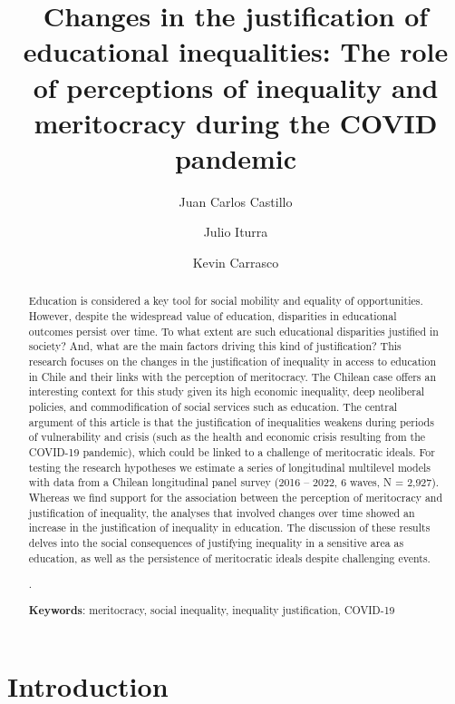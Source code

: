 \documentclass[
  12pt,
  a4paper,
]{article}
\title{Changes in the justification of educational inequalities: The role of perceptions of inequality and meritocracy during the COVID pandemic}
\author[1, 3]{Juan Carlos Castillo}
\affil[]{Department of Sociology, Universidad de Chile \thanks{\href{mailto:juancastillov@uchile.cl}{\nolinkurl{juancastillov@uchile.cl}}}}
\author[2]{Julio Iturra}
\affil[]{Bremen International Graduate School of Social Sciences, Universität Bremen}
\author[3]{Kevin Carrasco}
\affil[]{Center for Social Conflict and Cohesion Studies}
\date{}
\begin{document}
\maketitle
\begin{abstract}
Education is considered a key tool for social mobility and equality of opportunities. However, despite the widespread value of education, disparities in educational outcomes persist over time. To what extent are such educational disparities justified in society? And, what are the main factors driving this kind of justification? This research focuses on the changes in the justification of inequality in access to education in Chile and their links with the perception of meritocracy. The Chilean case offers an interesting context for this study given its high economic inequality, deep neoliberal policies, and commodification of social services such as education. The central argument of this article is that the justification of inequalities weakens during periods of vulnerability and crisis (such as the health and economic crisis resulting from the COVID-19 pandemic), which could be linked to a challenge of meritocratic ideals. For testing the research hypotheses we estimate a series of longitudinal multilevel models with data from a Chilean longitudinal panel survey (2016 -- 2022, 6 waves, N = 2,927). Whereas we find support for the association between the perception of meritocracy and justification of inequality, the analyses that involved changes over time showed an increase in the justification of inequality in education. The discussion of these results delves into the social consequences of justifying inequality in a sensitive area as education, as well as the persistence of meritocratic ideals despite challenging events.

.
\newline
\newline

\textbf{Keywords}: meritocracy, social inequality, inequality justification, COVID-19
\end{abstract}








\pagebreak

\section{Introduction}\label{introduction}
\end{document}
